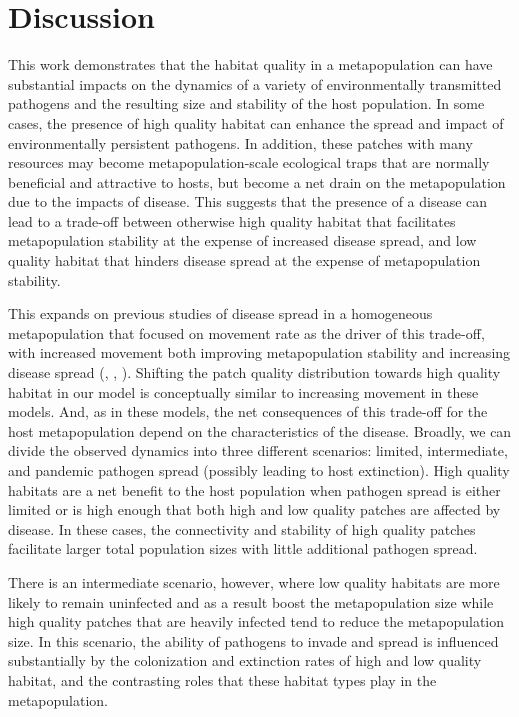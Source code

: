 \documentclass{article}
\begin{document}
\section{Discussion}
\label{discussion} 

This work demonstrates that the habitat quality in a metapopulation can have substantial impacts on the dynamics of a variety of environmentally transmitted pathogens and the resulting size and stability of the host population.
In some cases, the presence of high quality habitat can enhance the spread and impact of environmentally persistent pathogens.  
In addition, these patches with many resources may become metapopulation-scale ecological traps that are normally beneficial and attractive to hosts, but become a net drain on the metapopulation due to the impacts of disease. 
This suggests that the presence of a disease can lead to a trade-off between otherwise high quality habitat that facilitates metapopulation stability at the expense of increased disease spread, and low quality habitat that hinders disease spread at the expense of metapopulation stability.

This expands on previous studies of disease spread in a homogeneous metapopulation that focused on movement rate as the driver of this trade-off, with increased movement both improving metapopulation stability and increasing disease spread (\cite{Hess1996}, \cite{Gog2002}, \cite{Park2012}).  
Shifting the patch quality distribution towards high quality habitat in our model is conceptually similar to increasing movement in these models.
And, as in these models, the net consequences of this trade-off for the host metapopulation depend on the characteristics of the disease.
Broadly, we can divide the observed dynamics into three different scenarios: limited, intermediate, and pandemic pathogen spread (possibly leading to host extinction). 
High quality habitats are a net benefit to the host population when pathogen spread is either limited or is high enough that both high and low quality patches are affected by disease. 
In these cases, the connectivity and stability of high quality patches facilitate larger total population sizes with little additional pathogen spread.

There is an intermediate scenario, however, where low quality habitats are more likely to remain uninfected and as a result boost the metapopulation size while high quality patches that are heavily infected tend to reduce the metapopulation size. 
In this scenario, the ability of pathogens to invade and spread is influenced substantially by the colonization and extinction rates of high and low quality habitat, and the contrasting roles that these habitat types play in the metapopulation.
 
\end{document}
